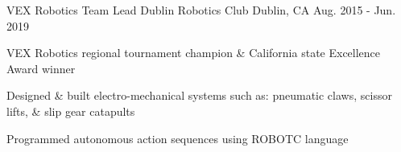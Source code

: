 \begin{cventries}







 \cventry
 {VEX Robotics Team Lead} %
 {Dublin Robotics Club} %
 {Dublin, CA} %
 {Aug. 2015 - Jun. 2019} %
 { %
 \begin{cvitems}
 \item {VEX Robotics regional tournament champion \& California state Excellence Award winner}
 \item {Designed \& built electro-mechanical systems such as: pneumatic claws, scissor lifts, \& slip gear catapults}
 \item {Programmed autonomous action sequences using ROBOTC language}
 \end{cvitems}
 }


\end{cventries}
